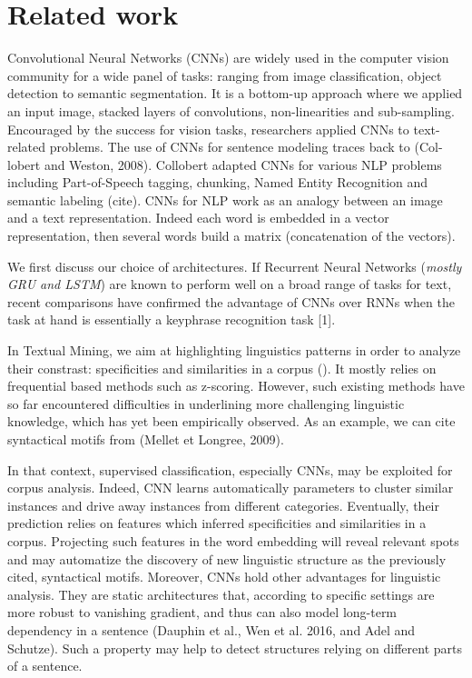\section{Related work}

Convolutional Neural Networks (CNNs) are widely used in the computer vision community for a wide panel of tasks: ranging from image classification, 
object detection to semantic segmentation. It is a bottom-up approach where we applied an input image, stacked layers of convolutions, non-linearities and sub-sampling.
Encouraged by the success for vision tasks, researchers applied CNNs to text-related problems. The use of CNNs for sentence modeling traces back to (Col-
lobert and Weston, 2008). Collobert adapted 
CNNs for various NLP problems including Part-of-Speech tagging, chunking, Named Entity Recognition and semantic labeling (cite). 
CNNs for NLP work as an analogy between an image and a text representation. Indeed each word is embedded in a vector representation, then several words build a matrix (concatenation of the vectors). 


We first discuss our choice of architectures. 
If Recurrent Neural Networks (\textit{mostly GRU and LSTM}) are known to perform well on a broad range of tasks for text, recent comparisons have confirmed the advantage of CNNs 
over RNNs when the task at hand is essentially a keyphrase recognition task [1]. 

In Textual Mining, we aim at highlighting linguistics patterns in order to analyze their constrast: specificities and similarities in a corpus (\cite{Aho:72}). It mostly relies on frequential based methods such as z-scoring. However, such existing methods have so far encountered difficulties in underlining more challenging linguistic knowledge, which has yet been empirically observed.  As an example, we can cite syntactical motifs from (Mellet et Longree, 2009).

In that context, supervised classification, especially CNNs, may be exploited for corpus analysis. Indeed, CNN learns automatically parameters to cluster similar instances and drive away instances from different categories. Eventually, their prediction relies on features which inferred specificities and similarities in a corpus. Projecting such features in the word embedding will reveal relevant spots and may automatize the discovery of new linguistic structure as the previously cited, syntactical motifs. Moreover, CNNs hold other advantages for linguistic analysis. They are static architectures that, according to specific settings are more robust to vanishing gradient, and thus can also model long-term dependency in a sentence (Dauphin et al., Wen et al. 2016, and Adel and Schutze). Such a property may help to detect structures relying on different parts of a sentence.

